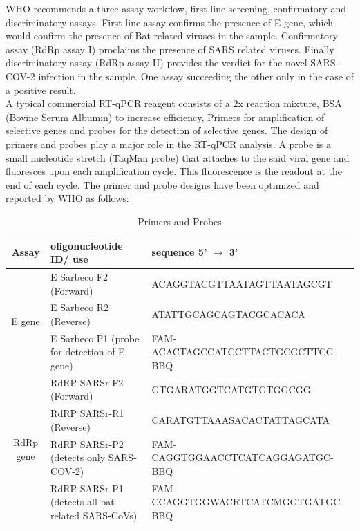 \documentclass[fleqn,10pt]{wlscirep}
\begin{document}
	WHO recommends a three assay workflow, first line screening, confirmatory and discriminatory assays. First line assay confirms the presence of E gene, which would confirm the presence of Bat related viruses in the sample. Confirmatory assay (RdRp assay I) proclaims the presence of SARS related viruses. Finally discriminatory assay (RdRp assay II) provides the verdict for the novel SARS-COV-2 infection in the sample. One assay succeeding the other only in the case of a positive result.\\
	
	A typical commercial RT-qPCR reagent consists of a 2x reaction mixture, BSA (Bovine Serum Albumin) to increase efficiency, Primers for amplification of selective genes and probes for the detection of selective genes. The design of primers and probes play a major role in the RT-qPCR analysis. A probe is a small nucleotide stretch (TaqMan probe) that attaches to the said viral gene and fluoresces upon each amplification cycle. This fluorescence is the readout at the end of each cycle. The primer and probe designs have been optimized and reported by WHO as follows:
	\begin{table}
		\begin{center}
			\begin{tabular}{ |c|l|l| } 
				\hline
				Assay & oligonucleotide ID/ use & sequence 5’ $\rightarrow$ 3’ \\ 
				\hline
				\multirow{3}{*}{E gene} & E Sarbeco F2 (Forward) & ACAGGTACGTTAATAGTTAATAGCGT \\  \cline{2-3}
				& E Sarbeco R2 (Reverse) & ATATTGCAGCAGTACGCACACA \\ \cline{2-3}
				& E Sarbeco P1 (probe for detection of E gene) & FAM-ACACTAGCCATCCTTACTGCGCTTCG-BBQ \\ \cline{2-3}
				\hline
				\multirow{4}{*}{RdRp gene} & RdRP SARSr-F2 (Forward) & GTGARATGGTCATGTGTGGCGG \\  \cline{2-3}
				& RdRP SARSr-R1 (Reverse) & CARATGTTAAASACACTATTAGCATA \\ \cline{2-3}
				& RdRP SARSr-P2 (detects only SARS-COV-2) & FAM-CAGGTGGAACCTCATCAGGAGATGC-BBQ \\ \cline{2-3}
				& RdRP SARSr-P1 (detects all bat related SARS-CoVs) & FAM-CCAGGTGGWACRTCATCMGGTGATGC-BBQ \\
				\cline{1-3}
				
				
				
			\end{tabular}
			\caption{Primers and Probes}
			\label{tab:primes}
		\end{center}
	\end{table}
	
\end{document}
